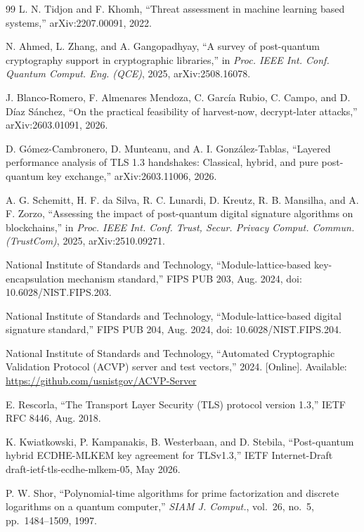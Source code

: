 \documentclass[conference]{IEEEtran}
\begin{document}
\begin{thebibliography}{99}
 L. N. Tidjon and F. Khomh, ``Threat assessment in machine learning based
systems,'' arXiv:2207.00091, 2022.

 N. Ahmed, L. Zhang, and A. Gangopadhyay, ``A survey of post-quantum
cryptography support in cryptographic libraries,'' in \textit{Proc. IEEE Int. Conf. Quantum Comput.
Eng. (QCE)}, 2025, arXiv:2508.16078.

 J. Blanco-Romero, F. Almenares Mendoza, C. Garc\'ia Rubio, C. Campo,
and D. D\'iaz S\'anchez, ``On the practical feasibility of harvest-now, decrypt-later attacks,''
arXiv:2603.01091, 2026.

 D. G\'omez-Cambronero, D. Munteanu, and A. I.
Gonz\'alez-Tablas, ``Layered performance analysis of TLS 1.3 handshakes: Classical, hybrid, and pure
post-quantum key exchange,'' arXiv:2603.11006, 2026.

 A. G. Schemitt, H. F. da Silva, R. C. Lunardi, D. Kreutz, R. B.
Mansilha, and A. F. Zorzo, ``Assessing the impact of post-quantum digital signature algorithms on
blockchains,'' in \textit{Proc. IEEE Int. Conf. Trust, Secur. Privacy Comput. Commun. (TrustCom)},
2025, arXiv:2510.09271.

 National Institute of Standards and Technology, ``Module-lattice-based
key-encapsulation mechanism standard,'' FIPS PUB 203, Aug. 2024, doi: 10.6028/NIST.FIPS.203.

 National Institute of Standards and Technology, ``Module-lattice-based digital
signature standard,'' FIPS PUB 204, Aug. 2024, doi: 10.6028/NIST.FIPS.204.

 National Institute of Standards and Technology, ``Automated Cryptographic Validation
Protocol (ACVP) server and test vectors,'' 2024. [Online]. Available:
\url{https://github.com/usnistgov/ACVP-Server}

 E. Rescorla, ``The Transport Layer Security (TLS) protocol version 1.3,'' IETF RFC
8446, Aug. 2018.

 K. Kwiatkowski, P. Kampanakis, B. Westerbaan, and D. Stebila,
``Post-quantum hybrid ECDHE-MLKEM key agreement for TLSv1.3,'' IETF Internet-Draft
draft-ietf-tls-ecdhe-mlkem-05, May 2026.

 P. W. Shor, ``Polynomial-time algorithms for prime factorization and discrete
logarithms on a quantum computer,'' \textit{SIAM J. Comput.}, vol.~26, no.~5, pp.~1484--1509, 1997.


\end{thebibliography}
\end{document}
